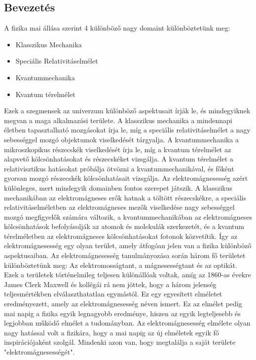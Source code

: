 \documentclass[../main.tex]{subfiles}
\begin{document}
\subsection{Bevezetés}
A fizika mai állása szerint 4 különböző nagy domaint különböztetünk meg:
\begin{itemize}
    \item Klasszikus Mechanika
    \item Speciális Relativitáselmélet
    \item Kvantummechanika
    \item Kvantum térelmélet
\end{itemize}
Ezek a szegmensek az univerzum különböző aspektusait írják le, és mindegyiknek megvan a maga alkalmazási területe. A klasszikus mechanika a mindennapi életben tapasztalható mozgásokat
írja le, míg a speciális relativitáselmélet a nagy sebességgel mozgó objektumok viselkedését tárgyalja. A kvantummechanika a mikroszkopikus részecskék viselkedését írja le, míg a kvantum térelmélet
az alapvető kölcsönhatásokat és részecskéket vizsgálja. A kvantum térelmélet a relativisztikus hatásokat próbálja ötvözni a kvantummechanikával, és főként gyorsan mozgó részecskék kölcsönhatásait vizsgálja.
\newline
\newline
Az elektromágnesesség azért különleges, mert mindegyik domainben fontos szerepet játszik. A klasszikus mechanikában az elektromágneses erők hatnak a töltött részecskékre,
a speciális relativitáselméletben az elektromágneses mezők viselkedése nagy sebességgel mozgó megfigyelők számára változik,
a kvantummechanikában az elektromágneses kölcsönhatások befolyásolják az atomok és molekulák szerkezetét,
és a kvantum térelméletben az elektromágneses kölcsönhatásokat fotonok közvetítik. Így az elektromágnesesség egy olyan terület, amely átfogóan jelen van a fizika különböző aspektusaiban.
\newline
\newline
Az elektromágnesesség tanulmányozása során három fő területet különböztetünk meg: Az elektromosságtant, a mágnesességtant és az optikát.
Ezek a területek történelmileg teljesen különállóak voltak, amíg az 1860-as évekre James Clerk Maxwell és kollégái rá nem jöttek, hogy a három jelenség
teljesmértékben elválaszthatatlan egymástól. Ez egy egyesített elméletet eredményezett, amely az elektromágnesesség néven ismert. Ez az elmélet pedig mai napig a 
fizika egyik legnagyobb eredménye, hiszen az egyik legteljesebb és legjobban működő elmélet a tudományban. Az elektromágnesesség elmélete olyan nagy hatással volt
a fizikára, hogy a mai napig az új elméletek egyik fő inspirációjaként szolgál. Mindenki azon van, hogy megtalálja a saját területe "elektromágnesességét".
\end{document}
